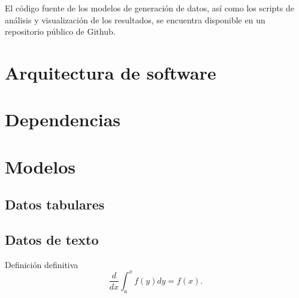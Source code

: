 El código fuente de los modelos de generación de datos, así como los scripts de análisis y visualización de los resultados, se encuentra disponible en un repositorio público de Github.

\section{Arquitectura de software}
\section{Dependencias}
\section{Modelos}
\subsection{Datos tabulares}
\subsection{Datos de texto}
\lipsum[1-3]
\begin{defn} Definición definitiva $$\frac{d}{dx}\int_a^xf(y)dy=f(x).$$\end{defn}